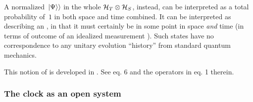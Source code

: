 A normalized $\left.\left| \Psi \right\rangle\right\rangle$ in the whole $\mathcal{H}_T \otimes \mathcal{H}_S$,
instead,
can be interpreted as a total probability of~$1$ in both space and time combined.
It can be interpreted as describing an ,
in that it
must certainly be in some point in space
\emph{and} time (in terms of outcome of an idealized measurement%
).
Such states have no correspondence to any unitary evolution ``history'' from standard quantum mechanics.

This notion of  is developed in \cite{MacconeGeomEvents}. See eq. 6 and the operators in eq. 1 therein.

\subsubsection*{The clock as an open system}

